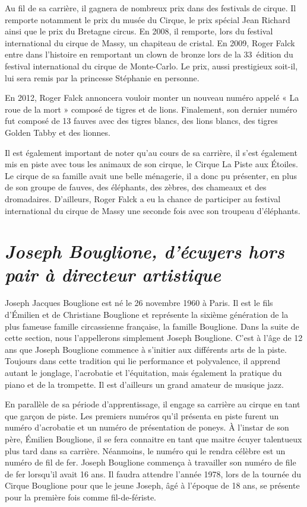 Au fil de sa carrière, il gagnera de nombreux prix dans des festivals de cirque. Il remporte notamment le prix du musée du Cirque, le prix spécial Jean Richard ainsi que le prix du Bretagne circus. En 2008, il remporte, lors du festival international du cirque de Massy, un chapiteau de cristal.  En 2009, Roger Falck entre dans l’histoire en remportant un clown de bronze lors de la 33\ieme~édition du festival international du cirque de Monte-Carlo. Le prix, aussi prestigieux soit-il, lui sera remis par la princesse Stéphanie en personne.

En 2012, Roger Falck annoncera vouloir monter un nouveau numéro appelé « La roue de la mort » composé de tigres et de lions. Finalement, son dernier numéro fut composé de 13 fauves avec des tigres blancs, des lions blancs, des tigres Golden Tabby et des lionnes.

Il est également important de noter qu’au cours de sa carrière, il s’est également mis en piste avec tous les animaux de son cirque, le Cirque La Piste aux Étoiles. Le cirque de sa famille avait une belle ménagerie, il a donc pu présenter, en plus de son groupe de fauves, des éléphants, des zèbres, des chameaux et des dromadaires. D’ailleurs, Roger Falck a eu la chance de participer au festival international du cirque de Massy une seconde fois avec son troupeau d’éléphants.

\section*{\textit{Joseph Bouglione, d’écuyers hors pair à directeur artistique}}
{}
Joseph Jacques Bouglione est né le 26 novembre 1960 à Paris. Il est le fils d'Émilien et de Christiane Bouglione et représente la sixième génération de la plus fameuse famille circassienne française, la famille Bouglione. Dans la suite de cette section, nous l’appellerons simplement Joseph Bouglione. C’est à l’âge de 12 ans que Joseph Bouglione commence à s’initier aux différents arts de la piste. Toujours dans cette tradition qui lie performance et polyvalence, il apprend autant le jonglage, l’acrobatie et l’équitation, mais également la pratique du piano et de la trompette. Il est d’ailleurs un grand amateur de musique jazz.

En parallèle de sa période d’apprentissage, il engage sa carrière au cirque en tant que garçon de piste. Les premiers numéros qu’il présenta en piste furent un numéro d’acrobatie et un numéro de présentation de poneys. À l’instar de son père, Émilien Bouglione, il se fera connaitre en tant que maitre écuyer talentueux plus tard dans sa carrière. Néanmoins, le numéro qui le rendra célèbre est un numéro de fil de fer. Joseph Bouglione commença à travailler son numéro de file de fer lorsqu’il avait 16 ans. Il faudra attendre l’année 1978, lors de la tournée du Cirque Bouglione pour que le jeune Joseph, âgé à l’époque de 18 ans, se présente pour la première fois comme fil-de-fériste.

